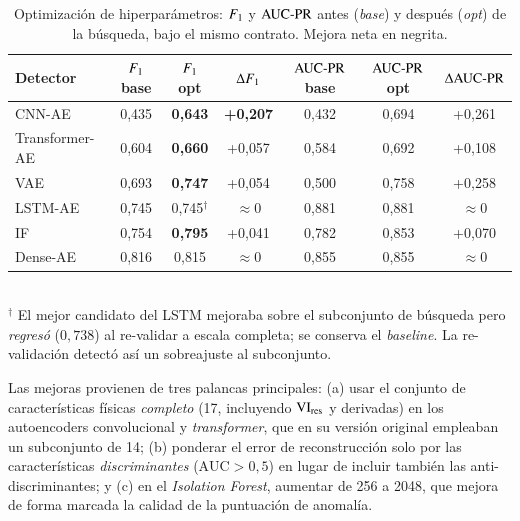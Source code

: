\begin{table}[H]
\centering
\caption{Optimización de hiperparámetros: $F_{1}$ y $\text{AUC-PR}$ antes (\emph{base})
y después (\emph{opt}) de la búsqueda, bajo el mismo contrato. Mejora neta en
negrita.}
\label{tab:optim}
\footnotesize
\begin{tabular}{lcccccc}
\toprule
Detector & $F_{1}$ base & $F_{1}$ opt & $\Delta F_{1}$ & $\text{AUC-PR}$ base & $\text{AUC-PR}$ opt & $\Delta\text{AUC-PR}$ \\
\midrule
CNN-AE         & 0{,}435 & \textbf{0{,}643} & \textbf{+0{,}207} & 0{,}432 & 0{,}694 & +0{,}261 \\
Transformer-AE & 0{,}604 & \textbf{0{,}660} & +0{,}057 & 0{,}584 & 0{,}692 & +0{,}108 \\
VAE            & 0{,}693 & \textbf{0{,}747} & +0{,}054 & 0{,}500 & 0{,}758 & +0{,}258 \\
LSTM-AE        & 0{,}745 & 0{,}745$^{\dagger}$ & $\approx$0 & 0{,}881 & 0{,}881 & $\approx$0 \\
IF             & 0{,}754 & \textbf{0{,}795} & +0{,}041 & 0{,}782 & 0{,}853 & +0{,}070 \\
Dense-AE       & 0{,}816 & 0{,}815 & $\approx$0 & 0{,}855 & 0{,}855 & $\approx$0 \\
\bottomrule
\end{tabular}
\\[2pt]
{\footnotesize $^{\dagger}$ El mejor candidato del LSTM mejoraba sobre el subconjunto de búsqueda pero \emph{regresó} ($0{,}738$) al re-validar a escala completa; se conserva el \emph{baseline}. La re-validación detectó así un sobreajuste al subconjunto.}
\end{table}

Las mejoras provienen de tres palancas principales: (a) usar el conjunto de
características físicas \emph{completo} (17, incluyendo $\mathrm{VI}_{\text{res}}$ y derivadas) en
los autoencoders convolucional y \emph{transformer}, que en su versión original
empleaban un subconjunto de 14; (b) ponderar el error de reconstrucción solo por
las características \emph{discriminantes} ($\mathrm{AUC}>0{,}5$) en lugar de
incluir también las anti-discriminantes; y (c) en el \emph{Isolation Forest},
aumentar  de 256 a 2048, que mejora de forma marcada la
calidad de la puntuación de anomalía.

